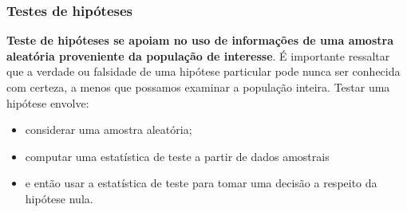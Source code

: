 \documentclass[14pt,aspectratio=1610]{beamer}
\begin{document}

\begin{frame}{}
\frametitle{Testes de hipóteses}
\vspace{-0.5cm}
\begin{block}{}
\justifying
\textbf{Teste de hipóteses se apoiam no uso de informações de uma amostra aleatória proveniente da população de interesse}. É importante ressaltar que a verdade ou 
falsidade de uma hipótese particular pode nunca ser conhecida com certeza, a menos que possamos examinar a população inteira. Testar uma hipótese envolve: 
\begin{itemize}
	\justifying
\item considerar uma amostra aleatória; \pause
\item computar uma estatística de teste a partir de dados amostrais \pause
\item e então usar a estatística de teste para tomar uma decisão a respeito da hipótese nula.
\end{itemize}
\end{block}
\end{frame}
\end{document}
